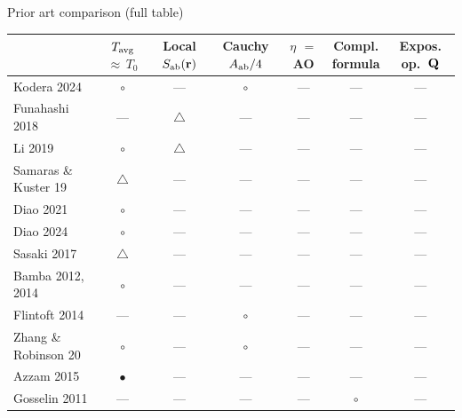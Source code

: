 
\begin{frame}[label=app-lit-table]{Prior art comparison (full table)}

  {\scriptsize
  \begin{tabular}{l cccccc}
    \toprule
    & \makecell{$\Tavg$\\[-2pt]${\approx}\,T_0$}
    & \makecell{Local\\[-2pt]$S_{\mathrm{ab}}(\mathbf{r})$}
    & \makecell{Cauchy\\[-2pt]$A_{\mathrm{ab}}/4$}
    & \makecell{$\eta$\\[-2pt]$=$ AO}
    & \makecell{Compl.\\[-2pt]formula}
    & \makecell{Expos.\\[-2pt]op.\ $\mathbf{Q}$} \\
    \midrule
    Kodera 2024         & $\circ$ & ---         & $\circ$     & ---   & ---     & --- \\
    Funahashi 2018      & ---     & $\triangle$ & ---         & ---   & ---     & --- \\
    Li 2019             & $\circ$ & $\triangle$ & ---         & ---   & ---     & --- \\
    Samaras \& Kuster 19 & $\triangle$ & ---     & ---         & ---   & ---     & --- \\
    Diao 2021           & $\circ$ & ---         & ---         & ---   & ---     & --- \\
    Diao 2024           & $\circ$ & ---         & ---         & ---   & ---     & --- \\
    Sasaki 2017         & $\triangle$ & ---     & ---         & ---   & ---     & --- \\
    Bamba 2012, 2014    & $\circ$ & ---         & ---         & ---   & ---     & --- \\
    Flintoft 2014       & ---     & ---         & $\circ$     & ---   & ---     & --- \\
    Zhang \& Robinson 20 & $\circ$ & ---         & $\circ$     & ---   & ---     & --- \\
    Azzam 2015           & $\bullet$ & ---       & ---         & ---   & ---     & --- \\
    Gosselin 2011       & ---     & ---         & ---         & ---   & $\circ$ & --- \\

\end{tabular}}
\end{frame}
